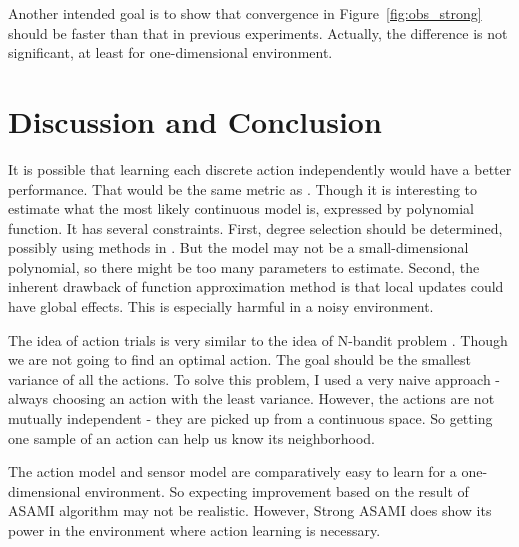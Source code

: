 \documentclass[10pt]{article}
\begin{document}
Another intended goal is to show that convergence in
Figure~\ref{fig:obs_strong} should be faster than that in previous
experiments. Actually, the difference is not significant, at least for
one-dimensional environment.

\section{Discussion and Conclusion}
\label{sec:dis}

It is possible that learning each discrete action independently would
have a better performance. That would be the same metric as
\cite{LNAI2007-ahmadi}. Though it is interesting to estimate what
the most likely continuous model is, expressed by polynomial function.
It has several constraints. First, degree selection should be
determined, possibly using methods in \cite{IJAIT08-stronger}. But the
model may not be a small-dimensional polynomial, so there might be
too many parameters to estimate. Second, the inherent drawback of
function approximation method is that local updates could have global
effects. This is especially harmful in a noisy environment.

The idea of action trials is very similar to the idea of N-bandit
problem \cite{vermorel2005multi}. Though we are not going to find an
optimal action. The goal should be the smallest variance of all the
actions. To solve this problem, I used a very naive approach - always
choosing an action with the least variance. However, the actions are
not mutually independent - they are picked up from a continuous space.
So getting one sample of an action can help us know its neighborhood.

The action model and sensor model are comparatively easy to learn for
a one-dimensional environment. So expecting improvement based on the
result of ASAMI algorithm may not be realistic. However, Strong ASAMI
does show its power in the environment where action learning is
necessary.




\end{document}
